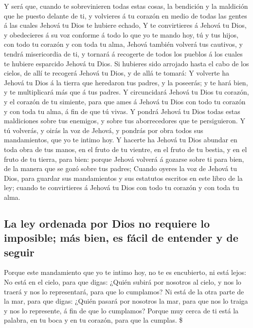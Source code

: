  Y será que, cuando te sobrevinieren todas estas cosas, la
bendición y la maldición que he puesto delante de ti, y volvieres á tu
corazón en medio de todas las gentes á las cuales Jehová tu Dios te
hubiere echado,  Y te convirtieres á Jehová tu Dios, y
obedecieres á su voz conforme á todo lo que yo te mando hoy, tú y tus
hijos, con todo tu corazón y con toda tu alma,  Jehová
también volverá tus cautivos, y tendrá misericordia de ti, y tornará á
recogerte de todos los pueblos á los cuales te hubiere esparcido Jehová
tu Dios.  Si hubieres sido arrojado hasta el cabo de los
cielos, de allí te recogerá Jehová tu Dios, y de allá te tomará:
 Y volverte ha Jehová tu Dios á la tierra que heredaron tus
padres, y la poseerás; y te hará bien, y te multiplicará más que á tus
padres.  Y circuncidará Jehová tu Dios tu corazón, y el
corazón de tu simiente, para que ames á Jehová tu Dios con todo tu
corazón y con toda tu alma, á fin de que tú vivas.  Y pondrá
Jehová tu Dios todas estas maldiciones sobre tus enemigos, y sobre tus
aborrecedores que te persiguieron.  Y tú volverás, y oirás
la voz de Jehová, y pondrás por obra todos sus mandamientos, que yo te
intimo hoy.  Y hacerte ha Jehová tu Dios abundar en toda
obra de tus manos, en el fruto de tu vientre, en el fruto de tu bestia,
y en el fruto de tu tierra, para bien: porque Jehová volverá á gozarse
sobre ti para bien, de la manera que se gozó sobre tus padres;
 Cuando oyeres la voz de Jehová tu Dios, para guardar sus
mandamientos y sus estatutos escritos en este libro de la ley; cuando te
convirtieres á Jehová tu Dios con todo tu corazón y con toda tu alma.

\hypertarget{la-ley-ordenada-por-dios-no-requiere-lo-imposible-muxe1s-bien-es-fuxe1cil-de-entender-y-de-seguir}{%
\subsection{La ley ordenada por Dios no requiere lo imposible; más bien,
es fácil de entender y de
seguir}\label{la-ley-ordenada-por-dios-no-requiere-lo-imposible-muxe1s-bien-es-fuxe1cil-de-entender-y-de-seguir}}

 Porque este mandamiento que yo te intimo hoy, no te es
encubierto, ni está lejos:  No está en el cielo, para que
digas: ¿Quién subirá por nosotros al cielo, y nos lo traerá y nos lo
representará, para que lo cumplamos?  Ni está de la otra
parte de la mar, para que digas: ¿Quién pasará por nosotros la mar, para
que nos lo traiga y nos lo represente, á fin de que lo cumplamos?
 Porque muy cerca de ti está la palabra, en tu boca y en tu
corazón, para que la cumplas. \$


